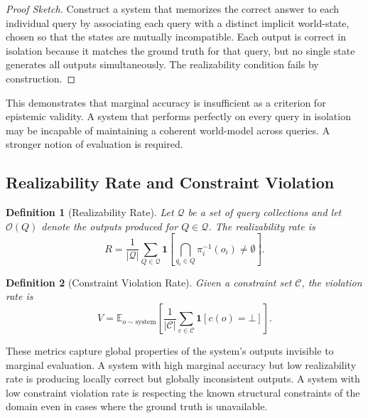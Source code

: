 \documentclass[12pt, oneside]{article}
\newtheorem{definition}{Definition}
\begin{document}
\begin{proof}[Proof Sketch]
Construct a system that memorizes the correct answer to each individual query by associating each query with a distinct implicit world-state, chosen so that the states are mutually incompatible. Each output is correct in isolation because it matches the ground truth for that query, but no single state generates all outputs simultaneously. The realizability condition fails by construction.
\end{proof}

This demonstrates that marginal accuracy is insufficient as a criterion for epistemic validity. A system that performs perfectly on every query in isolation may be incapable of maintaining a coherent world-model across queries. A stronger notion of evaluation is required.

\subsection{Realizability Rate and Constraint Violation}

\begin{definition}[Realizability Rate]
Let $\mathcal{Q}$ be a set of query collections and let $\mathcal{O}(Q)$ denote the outputs produced for $Q \in \mathcal{Q}$. The realizability rate is
\begin{equation}
  R = \frac{1}{|\mathcal{Q}|} \sum_{Q \in \mathcal{Q}} \mathbf{1}\!\left[ \bigcap_{q_i \in Q} \pi_i^{-1}(o_i) \neq \emptyset \right].
\end{equation}
\end{definition}

\begin{definition}[Constraint Violation Rate]
Given a constraint set $\mathcal{C}$, the violation rate is
\begin{equation}
  V = \mathbb{E}_{o \sim \text{system}} \left[ \frac{1}{|\mathcal{C}|} \sum_{c \in \mathcal{C}} \mathbf{1}[c(o) = \bot] \right].
\end{equation}
\end{definition}

These metrics capture global properties of the system's outputs invisible to marginal evaluation. A system with high marginal accuracy but low realizability rate is producing locally correct but globally inconsistent outputs. A system with low constraint violation rate is respecting the known structural constraints of the domain even in cases where the ground truth is unavailable.
\end{document}
